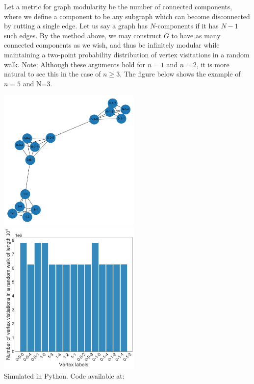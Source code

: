 \documentclass{article}
\begin{document}
Let a metric for graph modularity be the number of connected components, where we define a component to be any subgraph which can become disconnected by cutting a single edge. Let us say a graph has $N$-components if it has $N-1$ such edges. By the method above, we may construct $G$ to have as many connected components as we wish, and thus be infinitely modular while maintaining a two-point probability distribution of vertex visitations in a random walk. Note: Although these arguments hold for $n=1$ and $n=2$, it is more natural to see this in the case of $n\geq3$. The figure below shows the example of $n=5$ and N=3.

\begin{center}
    \includegraphics[width=7cm]{K5_K5_K5.png}
    \\
    \includegraphics[width=7cm]{K5_K5_K5_dist.png}
    \\
    Simulated in Python. Code available at: 
\end{center}
\end{document}
